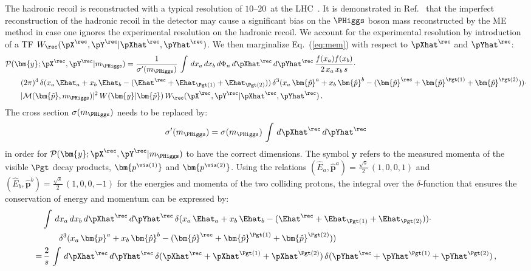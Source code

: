 The hadronic recoil is reconstructed with a typical resolution of $10$--$20$~\GeV at the LHC~\cite{CMS-JME-13-003,ATLAS-CONF-2014-019}.
It is demonstrated in Ref.~\cite{Alwall:2010cq} that the imperfect reconstruction of the hadronic recoil
in the detector may cause a significant bias on the $\PHiggs$ boson mass reconstructed by the ME method in case one ignores
the experimental resolution on the
hadronic recoil. We account
for the experimental resolution by introduction
of a TF $W_{\rec}( \pX^{\rec}, \pY^{\rec} | \pXhat^{\rec},
\pYhat^{\rec} )$.
We then marginalize Eq.~(\ref{eq:mem}) with respect to $\pXhat^{\rec}$ and $\pYhat^{\rec}$:
\begin{align}
& \mathcal{P}(\bm{y};\pX^{\rec},\pY^{\rec}|m_{\PHiggs}) =
\frac{1}{\sigma'(m_{\PHiggs})} \, \int \, dx_{a} \, dx_{b} \, d\Phi_{n} \,
d\pXhat^{\rec} \, d\pYhat^{\rec} \, \frac{f(x_{a}) f(x_{b})}{2 \,
  x_{a} \, x_{b} \, s} \cdot \nonumber \\
& \qquad (2\pi)^{4} \, \delta( x_{a} \, \Ehat_{a} + x_{b} \, \Ehat_{b} -
(\Ehat^{\rec} + \Ehat_{\Pgt(1)} + \Ehat_{\Pgt(2)}) ) \, \delta^{3}( x_{a} \,
\bm{\hat{p}}^{a} + x_{b} \, \bm{\hat{p}}^{b} - (\bm{\hat{p}}^{\rec} + \bm{\hat{p}}^{\Pgt(1)}
+ \bm{\hat{p}}^{\Pgt(2)}) ) \cdot \nonumber \\
& \qquad \vert \mathcal{M}(\bm{\tilde{p}},m_{\PHiggs}) \vert^{2} \, W(\bm{y}|\bm{\hat{p}}) \, W_{\rec}( \pX^{\rec}, \pY^{\rec} | \pXhat^{\rec}, \pYhat^{\rec} ) \, .
\label{eq:mem_mod_hadRecoil}
\end{align}
The cross section $\sigma(m_{\PHiggs})$ needs to be replaced by:
\begin{equation}
\sigma'(m_{\PHiggs}) = \sigma(m_{\PHiggs}) \, \int \, d\pXhat^{\rec} \, d\pYhat^{\rec} 
\end{equation}
in order for $\mathcal{P}(\bm{y};\pX^{\rec},\pY^{\rec}|m_{\PHiggs})$ to have the correct dimensions.
The symbol $\bm{y}$ refers to the measured momenta of the visible $\Pgt$ decay products, $\bm{p^{\vis(1)}}$ and $\bm{p^{\vis(2)}}$.
Using the relations $(\hat{E}_{a},\bm{\hat{p}}^{a}) = \frac{\sqrt{s}}{2} \, (1, 0,
0, 1)$ and $(\hat{E}_{b},\bm{\hat{p}}^{b}) = \frac{\sqrt{s}}{2} \, (1,
0, 0, -1)$
for the energies and momenta of the two colliding protons,
the integral over the $\delta$-function that ensures the conservation of energy and momentum can be expressed by:
\begin{align}
& \int \, dx_{a} \, dx_{b} \, d\pXhat^{\rec} \, d\pYhat^{\rec} \, \delta(
x_{a} \, \Ehat_{a} + x_{b} \, \Ehat_{b} - (\Ehat^{\rec} +
\Ehat_{\Pgt(1)} + \Ehat_{\Pgt(2)})) \cdot \nonumber \\
& \qquad \delta^{3}(
x_{a} \, \bm{p}^{a} + x_{b} \, \bm{\hat{p}}^{b} - (\bm{\hat{p}}^{\rec} +
\bm{\hat{p}}^{\Pgt(1)} + \bm{\hat{p}}^{\Pgt(2)})) \nonumber \\
= & \, \frac{2}{s} \, \int \,
d\pXhat^{\rec} \, d\pYhat^{\rec} \, 
\delta( \pXhat^{\rec} + \pXhat^{\Pgt(1)} + \pXhat^{\Pgt(2)} ) \,
\delta( \pYhat^{\rec} + \pYhat^{\Pgt(1)} + \pYhat^{\Pgt(2)} ) \, ,
\label{eq:delta4}
\end{align}
